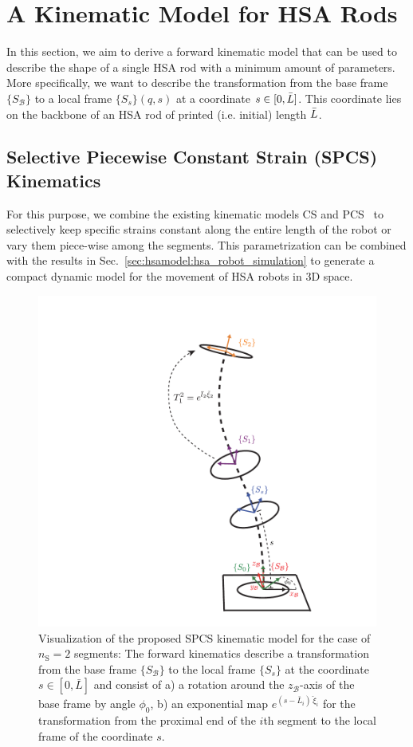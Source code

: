\section{A Kinematic Model for HSA Rods}\label{sec:hsamodel:hsa_rod_kinematics}
In this section, we aim to derive a forward kinematic model that can be used to describe the shape of a single \gls{HSA} rod with a minimum amount of parameters. More specifically, we want to describe the transformation from the base frame $\{ S_{\mathcal{B}} \}$ to a local frame $\{ S_s \}(q,s)$ at a coordinate $s \in [0, \Bar{L}]$. This coordinate lies on the backbone of an \gls{HSA} rod of printed (i.e. initial) length $\Bar{L}$.

\subsection{Selective Piecewise Constant Strain (SPCS) Kinematics}\label{sub:hsamodel:hsa_rod_kinematics:spcs_kinematics}
For this purpose, we combine the existing kinematic models \gls{CS} and \gls{PCS}~\citep{renda2018discrete} to selectively keep specific strains constant along the entire length of the robot or vary them piece-wise among the segments.
This parametrization can be combined with the results in Sec.~\ref{sec:hsamodel:hsa_robot_simulation} to generate a compact dynamic model for the movement of HSA robots in 3D space.
\begin{figure}[htb]
    \centering
    \includegraphics[width=0.25\columnwidth]{hsamodel/figures/kinematics/twisting_kinematics_v2_cropped.pdf}
    \caption{Visualization of the proposed \gls{SPCS} kinematic model for the case of $n_\mathrm{S} = 2$ segments: The forward kinematics describe a transformation from the base frame $\{ S_{\mathcal{B}} \}$ to the local frame $\{ S_s \}$ at the coordinate $s \in [0, \bar{L}]$ and consist of a) a rotation around the $z_{\mathcal{B}}$-axis of the base frame by angle $\phi_0$, b) an exponential map $e^{(s-\bar{L}_i) \, \check{\xi}_i}$ for the transformation from the proximal end of the $i$th segment to the local frame of the coordinate $s$. %
    }
    \label{fig:hsamodel:hsa_kinematics}
\end{figure}

